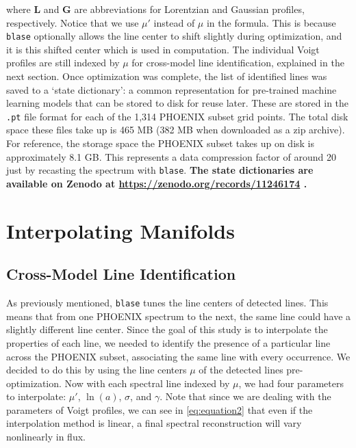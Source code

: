\documentclass[twocolumn, linenumbers]{aastex631}
\begin{document}
where $\mathbf{L}$ and $\mathbf{G}$ are abbreviations for Lorentzian and Gaussian profiles, respectively.
Notice that we use $\mu'$ instead of $\mu$ in the formula.
This is because \texttt{blase} optionally allows the line center to shift slightly during optimization, and it is this shifted center which is used in computation.
The individual Voigt profiles are still indexed by $\mu$ for cross-model line identification, explained in the next section.
Once optimization was complete, the list of identified lines was saved to a `state dictionary': a common representation for pre-trained machine learning models that can be stored to disk for reuse later.
These are stored in the \texttt{.pt} file format for each of the 1,314 PHOENIX subset grid points.
The total disk space these files take up is 465 MB (382 MB when downloaded as a zip archive).
For reference, the storage space the PHOENIX subset takes up on disk is approximately 8.1 GB.
This represents a data compression factor of around 20 just by recasting the spectrum with \texttt{blase}.
\textbf{The state dictionaries are available on Zenodo at \url{https://zenodo.org/records/11246174} \citep{zenodo}.}

\section{Interpolating Manifolds}
\label{sec:section3}
\subsection{Cross-Model Line Identification}
As previously mentioned, \texttt{blase} tunes the line centers of detected lines.
This means that from one PHOENIX spectrum to the next, the same line could have a slightly different line center.
Since the goal of this study is to interpolate the properties of each line, we needed to identify the presence of a particular line across the PHOENIX subset, associating the same line with every occurrence.
We decided to do this by using the line centers $\mu$ of the detected lines pre-optimization.
Now with each spectral line indexed by $\mu$, we had four parameters to interpolate: $\mu'$, $\ln(a)$, $\sigma$, and $\gamma$.
Note that since we are dealing with the parameters of Voigt profiles, we can see in \autoref{eq:equation2} that even if the interpolation method is linear, a final spectral reconstruction will vary nonlinearly in flux.
\end{document}
